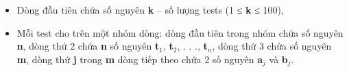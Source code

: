 \begin{itemize}
	\item Dòng đầu tiên chứa số nguyên \textbf{k} – số lượng tests (1 ≤ \textbf{k} ≤ 100),
	\item Mỗi test cho trên một nhóm dòng: dòng đầu tiên trong nhóm chứa số nguyên \textbf{n}, dòng thứ 2 chứa \textbf{n} số nguyên \textbf{t$_1$}, \textbf{t$_2$}, . . ., \textbf{t$_n$}, dòng thứ 3 chứa số nguyên \textbf{m}, dòng thứ \textbf{j} trong \textbf{m} dòng tiếp theo chứa 2 số nguyên \textbf{a$_j$} và \textbf{b$_j$}.
\end{itemize}